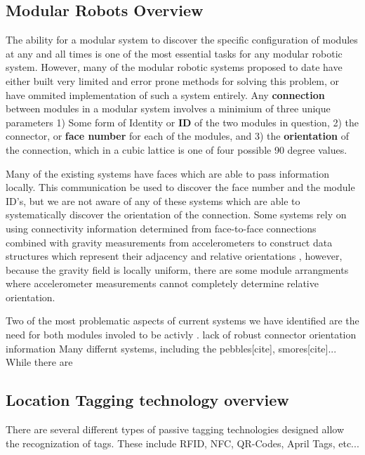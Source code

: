 \subsection{Modular Robots Overview}
\label{sec:RWconfiguration}
	The ability for a modular system to discover the specific configuration of modules at any and all times is one of the most essential tasks for any modular robotic system. However, many of the modular robotic systems proposed to date have either built very limited and error prone methods for solving this problem, or have ommited implementation of such a system entirely. Any \textbf{connection} between modules in a modular system involves a minimium of three unique parameters 1) Some form of Identity or \textbf{ID} of the two modules in question, 2) the connector, or \textbf{face number} for each of the modules, and 3) the \textbf{orientation} of the connection, which in a cubic lattice is one of four possible 90 degree values.

	Many of the existing systems have faces which are able to pass information locally. This communication be used to discover the face number and the module ID's, but we are not aware of any of these systems which are able to systematically discover the orientation of the connection. Some systems rely on using connectivity information determined from face-to-face connections combined with gravity measurements from accelerometers to construct data structures which represent their adjacency and relative orientations \cite{Neubert2016}, however, because the gravity field is locally uniform, there are some module arrangments where accelerometer measurements cannot completely determine relative orientation.

	Two of the most problematic aspects of current systems we have identified are the need for both modules involed to be activly . lack of robust connector orientation information
	Many differnt systems, including the pebbles[cite], smores[cite]... While there are



\subsection{Location Tagging technology overview}
\label{sec:RWtaggingTech}

There are several different types of passive tagging technologies designed allow the recognization of tags. These include RFID, NFC, QR-Codes, April Tags, etc...
